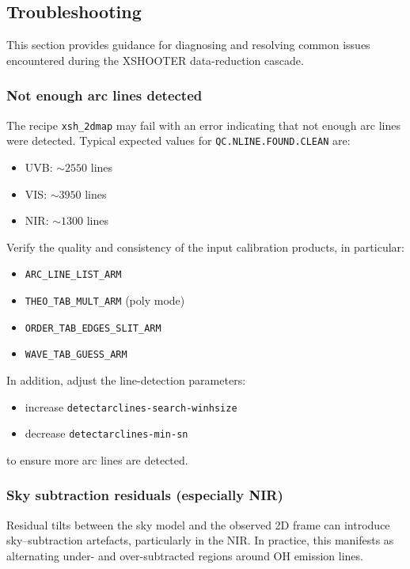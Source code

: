 \subsection{Troubleshooting}

This section provides guidance for diagnosing and resolving 
common issues encountered during the XSHOOTER data-reduction cascade.

\subsubsection{Not enough arc lines detected}

The recipe {\tt xsh\_2dmap} may fail with an error indicating that not enough arc lines were detected.
Typical expected values for {\tt QC.NLINE.FOUND.CLEAN} are:
\begin{itemize}
\item UVB: $\sim 2550$ lines
\item VIS: $\sim 3950$ lines
\item NIR: $\sim 1300$ lines
\end{itemize}

Verify the quality and consistency of the input calibration products, in particular:
\begin{itemize}
\item {\tt ARC\_LINE\_LIST\_ARM}
\item {\tt THEO\_TAB\_MULT\_ARM} (poly mode)
\item {\tt ORDER\_TAB\_EDGES\_SLIT\_ARM}
\item {\tt WAVE\_TAB\_GUESS\_ARM}
\end{itemize}

In addition, adjust the line-detection parameters:
\begin{itemize}
\item increase {\tt detectarclines-search-winhsize}
\item decrease {\tt detectarclines-min-sn}
\end{itemize}
to ensure more arc lines are detected.

\subsubsection{Sky subtraction residuals (especially NIR)}

Residual tilts between the sky model and the observed 2D frame
can introduce sky--subtraction artefacts, particularly in the NIR.
In practice, this manifests as alternating under- and over-subtracted regions
around OH emission lines.

